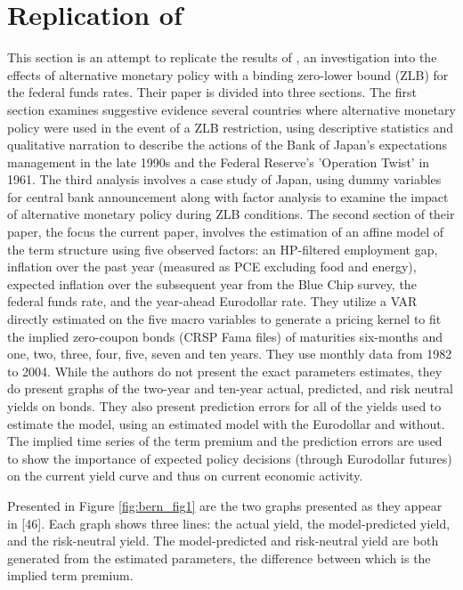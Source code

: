 \documentclass{article}
\numberwithin{equation}{section}
\begin{document}
\section{Replication of \citet{sack2005monetary}}\label{sec:repl}

This section is an attempt to replicate the results of
\citet{sack2005monetary}, an investigation into the effects of alternative
monetary policy with a binding zero-lower bound (ZLB) for the federal funds rates.
Their paper is divided into three sections. The first section examines
suggestive evidence several countries where alternative monetary policy were
used in the event of a ZLB restriction, using descriptive statistics and
qualitative narration to describe the actions of the Bank of Japan's
expectations management in the late 1990s and the Federal Reserve's 'Operation
Twist' in 1961. The third analysis involves a case study of Japan, using dummy
variables for central bank announcement along with factor analysis to examine
the impact of alternative monetary policy during ZLB conditions.
The second section of their paper, the focus the current paper,  involves the
estimation of an affine model of the term structure using five observed
factors: an HP-filtered employment gap, inflation over the past year (measured
as PCE excluding food and energy), expected inflation over the subsequent year
from the Blue Chip survey, the federal funds rate, and the year-ahead
Eurodollar rate. They utilize a VAR directly estimated on the five macro variables to
generate a pricing kernel to fit the implied zero-coupon bonds (CRSP Fama
files) of maturities six-months and one, two, three, four, five, seven and ten
years. They use monthly data from 1982 to 2004. While the authors do not
present the exact parameters estimates, they do present graphs of the two-year
and ten-year actual, predicted, and risk neutral yields on bonds. They also
present prediction errors for all of the yields used to estimate the model,
using an estimated model with the Eurodollar and without. The implied time
series of the term premium and the prediction errors are used to show the
importance of expected policy decisions (through Eurodollar futures) on the
current yield curve and thus on current economic activity.

Presented in Figure \ref{fig:bern_fig1} are the two graphs presented as they
appear in \citet{sack2005monetary}[46]. Each graph shows three lines: the
actual yield, the model-predicted yield, and the risk-neutral yield. The
model-predicted and risk-neutral yield are both generated from the estimated
parameters, the difference between which is the implied term premium. 
\end{document}
